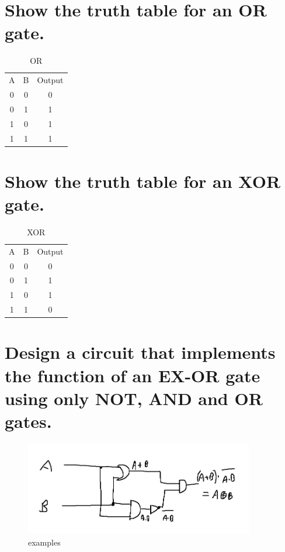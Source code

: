 \documentclass{article}
\begin{document}
\section{Show the truth table for an OR gate.}
\begin{table}[h]
    \centering
    \begin{tabular}{|c|c|c|}
        A & B & Output \\
        0 & 0 & 0\\
        0 & 1 & 1\\
        1 & 0 & 1\\
        1 & 1 & 1\\
    \end{tabular}
    \caption{OR}
    \label{tab:my_label}
\end{table}

\section{Show the truth table for an XOR gate.}
\begin{table}[h]
    \centering
    \begin{tabular}{|c|c|c|}
        A & B & Output \\
        0 & 0 & 0\\
        0 & 1 & 1\\
        1 & 0 & 1\\
        1 & 1 & 0\\
    \end{tabular}
    \caption{XOR}
    \label{tab:my_label}
\end{table}

\section{Design a circuit that implements the function of an EX-OR gate using only NOT, AND and OR gates.}

\begin{figure}[h]
    \centering
    \includegraphics[width=100mm]{digitalLogic2.PNG}
    \caption{examples}
    \label{fig:my_label}
\end{figure}
\newpage
\end{document}
